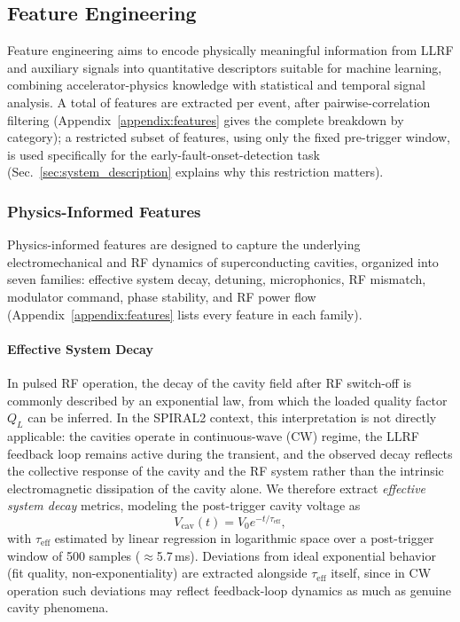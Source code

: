 \subsection{Feature Engineering}

Feature engineering aims to encode physically meaningful information from LLRF and auxiliary signals into quantitative descriptors suitable for machine learning, combining accelerator-physics knowledge with statistical and temporal signal analysis. A total of \MetricZeroSixBinaryClassificationNFeatures{} features are extracted per event, after pairwise-correlation filtering (Appendix~\ref{appendix:features} gives the complete breakdown by category); a restricted subset of \MetricZeroFivePhaseZeroPrecursorNFeatures{} features, using only the fixed pre-trigger window, is used specifically for the early-fault-onset-detection task (Sec.~\ref{sec:system_description} explains why this restriction matters).

\subsubsection{Physics-Informed Features}

Physics-informed features are designed to capture the underlying electromechanical and RF dynamics of superconducting cavities, organized into seven families: effective system decay, detuning, microphonics, RF mismatch, modulator command, phase stability, and RF power flow (Appendix~\ref{appendix:features} lists every feature in each family).

\paragraph{Effective System Decay}

In pulsed RF operation, the decay of the cavity field after RF switch-off is commonly described by an exponential law, from which the loaded quality factor $Q_L$ can be inferred. In the SPIRAL2 context, this interpretation is not directly applicable: the cavities operate in continuous-wave (CW) regime, the LLRF feedback loop remains active during the transient, and the observed decay reflects the collective response of the cavity and the RF system rather than the intrinsic electromagnetic dissipation of the cavity alone. We therefore extract \emph{effective system decay} metrics, modeling the post-trigger cavity voltage as
\begin{equation}
V_{\mathrm{cav}}(t) = V_0 e^{-t/\tau_{\mathrm{eff}}}, %
\end{equation}
with $\tau_{\mathrm{eff}}$ estimated by linear regression in logarithmic space over a post-trigger window of 500 samples ($\approx$5.7\,ms). %
Deviations from ideal exponential behavior (fit quality, non-exponentiality) are extracted alongside $\tau_{\mathrm{eff}}$ itself, since in CW operation such deviations may reflect feedback-loop dynamics as much as genuine cavity phenomena.

